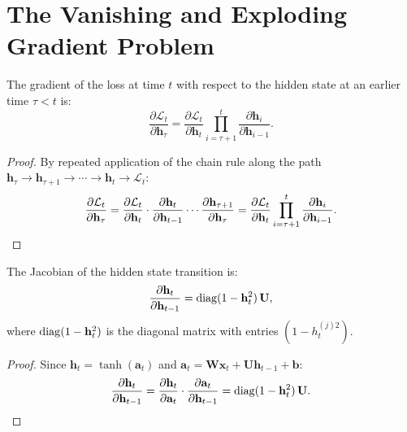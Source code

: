 \documentclass[11pt,a4paper]{article}
\begin{document}
\section{The Vanishing and Exploding Gradient Problem}
\label{sec:gradient-problem}

\begin{theorem}
\label{thm:long-range}
The gradient of the loss at time $t$ with respect to the hidden
state at an earlier time $\tau < t$ is:
\begin{equation}
  \frac{\partial \mathcal{L}_t}{\partial \mathbf{h}_\tau}
    = \frac{\partial \mathcal{L}_t}{\partial \mathbf{h}_t}
      \prod_{i=\tau+1}^{t} \frac{\partial \mathbf{h}_i}
        {\partial \mathbf{h}_{i-1}}.
  \label{eq:long-range}
\end{equation}
\end{theorem}

\begin{proof}
By repeated application of the chain rule along the path
$\mathbf{h}_\tau \to \mathbf{h}_{\tau+1} \to \cdots \to
\mathbf{h}_t \to \mathcal{L}_t$:
\[
  \frac{\partial \mathcal{L}_t}{\partial \mathbf{h}_\tau}
    = \frac{\partial \mathcal{L}_t}{\partial \mathbf{h}_t}
      \cdot \frac{\partial \mathbf{h}_t}{\partial \mathbf{h}_{t-1}}
      \cdots \frac{\partial \mathbf{h}_{\tau+1}}
        {\partial \mathbf{h}_\tau}
    = \frac{\partial \mathcal{L}_t}{\partial \mathbf{h}_t}
      \prod_{i=\tau+1}^{t} \frac{\partial \mathbf{h}_i}
        {\partial \mathbf{h}_{i-1}}.  \qedhere
\]
\end{proof}

\begin{lemma}
\label{lem:jacobian}
The Jacobian of the hidden state transition is:
\begin{equation}
  \frac{\partial \mathbf{h}_t}{\partial \mathbf{h}_{t-1}}
    = \operatorname{diag}(1 - \mathbf{h}_t^2) \, \mathbf{U},
  \label{eq:jacobian}
\end{equation}
where $\operatorname{diag}(1 - \mathbf{h}_t^2)$ is the diagonal matrix with entries
$(1 - h_t^{(j)2})$.
\end{lemma}

\begin{proof}
Since $\mathbf{h}_t = \tanh(\mathbf{a}_t)$ and
$\mathbf{a}_t = \mathbf{W}\mathbf{x}_t + \mathbf{U}\mathbf{h}_{t-1}
+ \mathbf{b}$:
\[
  \frac{\partial \mathbf{h}_t}{\partial \mathbf{h}_{t-1}}
    = \frac{\partial \mathbf{h}_t}{\partial \mathbf{a}_t}
      \cdot \frac{\partial \mathbf{a}_t}{\partial \mathbf{h}_{t-1}}
    = \operatorname{diag}(1 - \mathbf{h}_t^2) \, \mathbf{U}.  \qedhere
\]
\end{proof}
\end{document}
